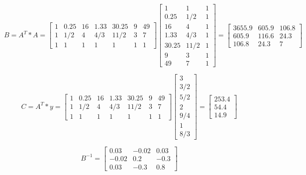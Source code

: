 \documentclass[a4paper,norsk]{article}
\begin{document}
\begin{equation*}
B = A^{T} * A = \begin{bmatrix}1 & 0.25 & 16 & 1.33& 30.25 & 9 & 49 \\1 & 1/2 & 4 & 4/3 & 11/2 & 3 & 7\\1 & 1 & 1 & 1& 1 & 1 & 1 \end{bmatrix}
\begin{bmatrix}1 & 1 & 1 \\ 0.25 & 1/2 & 1 \\16 & 4 & 1 \\1.33 & 4/3 & 1 \\30.25 & 11/2 & 1 \\9 & 3 & 1 \\49 & 7 & 1\end{bmatrix}
=\begin{bmatrix}3655.9 & 605.9 & 106.8\\605.9 & 116.6 & 24.3\\ 106.8 & 24.3 & 7\end{bmatrix}
\end{equation*}

\begin{equation*}
C = A^{T} * y = \begin{bmatrix}1 & 0.25 & 16 & 1.33& 30.25 & 9 & 49 \\1 & 1/2 & 4 & 4/3 & 11/2 & 3 & 7\\1 & 1 & 1 & 1& 1 & 1 & 1 \end{bmatrix}
\begin{bmatrix}3 \\ 3/2 \\ 5/2 \\ 2 \\ 9/4 \\ 1 \\ 8/3\end{bmatrix}
=\begin{bmatrix} 253.4 \\ 54.4 \\ 14.9 \end{bmatrix}
\end{equation*}

\begin{equation*}
B^{-1} = \begin{bmatrix} 0.03 & -0.02 & 0.03 \\ -0.02 & 0.2 & -0.3 \\  0.03 & -0.3 & 0.8\end{bmatrix}
\end{equation*}
\end{document}
